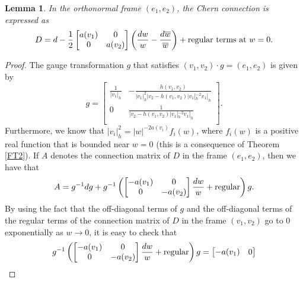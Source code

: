 \documentclass[11pt]{article}
\numberwithin{equation}{section}
\newtheorem{Lemma}[Theorem]{Lemma}
\numberwithin{equation}{section}
\begin{document}
\begin{Lemma} In the orthonormal frame $(e_1,e_2)$, the Chern connection is expressed as
\begin{equation*}
 D={\rm d} - \frac{1}{2}\begin{bmatrix} a(v_1) & 0 \\
 0 & a(v_2) \\
 \end{bmatrix}\left(\frac{{\rm d}w}{w}- \frac{{\rm d}\overline{w}}{\overline{w}}\right) + \text{regular terms at $w=0$}.
\end{equation*}

\end{Lemma}
\begin{proof}
The gauge transformation $g$ that satisfies $(v_1,v_2)\cdot g=(e_1,e_2)$ is given by
\begin{equation*}
 g=\begin{bmatrix}
 \frac{1}{|v_1|_h}&-\frac{h(v_1,v_2)}{|v_1|^2_h|v_2-h(v_1,v_2)|v_1|_h^{-2}v_1|_h}\\
 0 & \frac{1}{|v_2-h(v_1,v_2)|v_1|_h^{-2}v_1|_h}\\
 \end{bmatrix}.
\end{equation*}
Furthermore, we know that $|v_i|_h^2=|w|^{-2a(v_i)}f_i(w)$, where $f_i(w)$ is a positive real function that is bounded near $w=0$ (this is a consequence of Theorem \ref{FT2}). If $A$ denotes the connection matrix of $D$ in the frame $(e_1,e_2)$, then we have that
\begin{equation*}
 A=g^{-1}{\rm d}g + g^{-1}\left(\begin{bmatrix} -a(v_1) & 0 \\
 0 & -a(v_2) \\
 \end{bmatrix}\frac{{\rm d}w}{w} + \text{regular}\right)g.
\end{equation*}
By using the fact that the off-diagonal terms of $g$ and the off-diagonal terms of the regular terms of the connection matrix of $D$ in the frame $(v_1,v_2)$ go to 0 exponentially as $w\to 0$, it is easy to check that
\begin{equation*}
 g^{-1}\left(\begin{bmatrix} -a(v_1) & 0 \\
 0 & -a(v_2) \\
 \end{bmatrix}\frac{{\rm d}w}{w} + \text{regular}\right)g=\begin{bmatrix} -a(v_1) & 0 \\

\end{bmatrix}
\end{equation*}
\end{proof}
\end{document}

